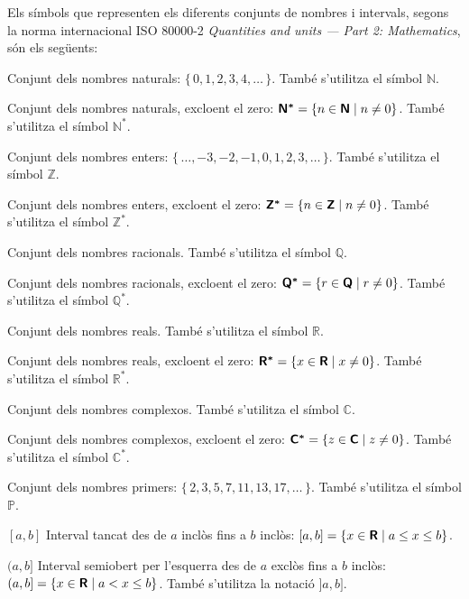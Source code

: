 \pagebreak

Els símbols que representen els diferents conjunts de nombres i intervals, segons la norma internacional ISO 80000-2 \textit{Quantities and units --- Part 2: Mathematics}, són els següents:

\begin{list}{}
{\setlength{\labelwidth}{15mm} \setlength{\leftmargin}{20mm}
\setlength{\labelsep}{5mm}}
    \item[\mathsfb{N}] Conjunt dels nombres naturals: $\{\,0,1,2,3,4,\ldots\,\}$. També s'utilitza el símbol $\mathbb{N}$.
    \item[\mathsfb{N^*}] Conjunt dels nombres naturals, excloent el zero: ${\boldsymbol{\mathsf{N^*}}} = \{ n \in {\ensuremath{\boldsymbol{\mathsf{N}}}} \mid n \ne 0\}$. També s'utilitza el símbol $\mathbb{N^*}$.
    \item[\mathsfb{Z}] Conjunt dels nombres enters: $\{\,\ldots,-3,-2,-1,0,1,2,3,\ldots\,\}$.
     També s'utilitza el símbol $\mathbb{Z}$.
    \item[\mathsfb{Z^*}] Conjunt dels nombres enters, excloent el zero: ${\boldsymbol{\mathsf{Z^*}}} = \{ n \in {\ensuremath{\boldsymbol{\mathsf{Z}}}} \mid n \ne 0\}$. També s'utilitza el símbol $\mathbb{Z^*}$.
     \item[\mathsfb{Q}] Conjunt dels nombres racionals. També s'utilitza el símbol $\mathbb{Q}$.
     \item[\mathsfb{Q^*}] Conjunt dels nombres racionals, excloent el zero: ${\boldsymbol{\mathsf{Q^*}}} = \{ r \in {\ensuremath{\boldsymbol{\mathsf{Q}}}} \mid r \ne 0\}$. També s'utilitza el símbol $\mathbb{Q^*}$.
     \item[\mathsfb{R}] Conjunt dels nombres reals. També s'utilitza el símbol $\mathbb{R}$.
	 \item[\mathsfb{R^*}] Conjunt dels nombres reals, excloent el zero: ${\boldsymbol{\mathsf{R^*}}} = \{ x \in {\ensuremath{\boldsymbol{\mathsf{R}}}} \mid x \ne 0\}$. També s'utilitza el símbol $\mathbb{R^*}$.
     \item[\mathsfb{C}] Conjunt dels nombres complexos. També s'utilitza el símbol $\mathbb{C}$.
     \item[\mathsfb{C^*}] Conjunt dels nombres complexos, excloent el zero: ${\boldsymbol{\mathsf{C^*}}} = \{ z \in {\ensuremath{\boldsymbol{\mathsf{C}}}} \mid z \ne 0\}$. També s'utilitza el símbol $\mathbb{C^*}$.
     \item[\mathsfb{P}] Conjunt dels nombres primers: $\{\,2,3,5,7,11,13,17,\ldots\,\}$. També s'utilitza el símbol $\mathbb{P}$.
     \item[{$[a,b]$}] Interval tancat des de $a$ inclòs fins a $b$ inclòs: $[a,b] = \{x \in {\ensuremath{\boldsymbol{\mathsf{R}}}} \mid a \leq x \leq b\}$.
     \item[{$(a,b]$}] Interval semiobert per l'esquerra des de $a$ exclòs fins a $b$ inclòs: $(a,b] = \{x \in {\ensuremath{\boldsymbol{\mathsf{R}}}} \mid a < x \leq b\}$. També s'utilitza la notació $]a,b]$.

\end{list}
